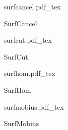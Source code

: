 \documentclass[12pt,a4paper]{article}
\newcommand{\incfig}[1]{%
    \def\svgwidth{\columnwidth}
    {#1.pdf_tex}
}
\begin{document}
\begin{figure}[ht]
    \centering
	\begin{minipage}[c][\totalheight][c]{\columnwidth}
    \incfig{surfcancel}
    \caption{SurfCancel}
	\end{minipage}
    \label{fig:surfcancel}
\end{figure}

\begin{figure}[ht]
    \centering
	\begin{minipage}[c][\totalheight][c]{\columnwidth}
    \incfig{surfcut}
    \caption{SurfCut}
	\end{minipage}
    \label{fig:surfcut}
\end{figure}

\begin{figure}[ht]
    \centering
	\begin{minipage}[c][\totalheight][c]{\columnwidth}
    \incfig{surfhom}
    \caption{SurfHom}
	\end{minipage}
    \label{fig:surfhom}
\end{figure}

\begin{figure}[ht]
    \centering
	\begin{minipage}[c][\totalheight][c]{\columnwidth}
    \incfig{surfmobius}
    \caption{SurfMobius}
	\end{minipage}
    \label{fig:surfmobius}
\end{figure}
\end{document}
